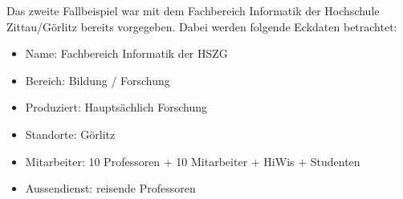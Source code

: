 Das zweite Fallbeispiel war mit dem Fachbereich Informatik der Hochschule Zittau/Görlitz bereits vorgegeben. Dabei werden folgende Eckdaten betrachtet:

\begin{itemize}
\item Name: Fachbereich Informatik der HSZG
\item Bereich: Bildung / Forschung
\item Produziert: Hauptsächlich Forschung
\item Standorte: Görlitz
\item Mitarbeiter: 10 Professoren + 10 Mitarbeiter + HiWis + Studenten
\item Aussendienst: reisende Professoren
\end{itemize}

